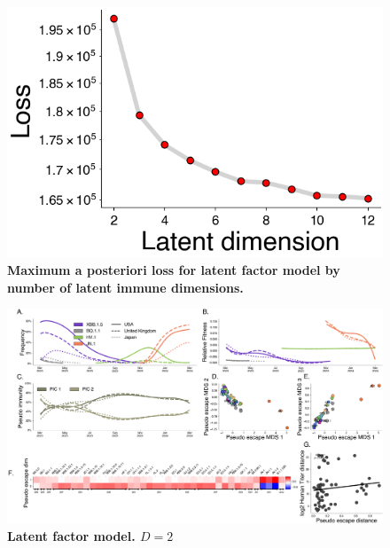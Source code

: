 \documentclass[11pt,oneside,letterpaper]{article}
\begin{document}
\begin{figure}[t!]
    \centering
    \includegraphics[width=1.0\textwidth=0.01]{./supplementary_figures/loss_by_latent_dimension.png}
    \caption{
      \textbf{Maximum a posteriori loss for latent factor model by number of latent immune dimensions.}
    }
    \label{fig:latent_factor_dimension}
\end{figure}

\begin{figure}[t!]
    \centering
    \includegraphics[width=1.0\textwidth=0.01]{./supplementary_figures/latent_immune_2_dims.png}
    \caption{
      \textbf{Latent factor model. $D=2$}
    }
    \label{fig:latent_factor_2}
\end{figure}
\end{document}
